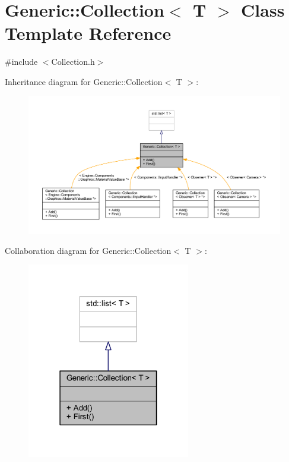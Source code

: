 \hypertarget{classGeneric_1_1Collection}{}\section{Generic\+:\+:Collection$<$ T $>$ Class Template Reference}
\label{classGeneric_1_1Collection}


{\ttfamily \#include $<$Collection.\+h$>$}



Inheritance diagram for Generic\+:\+:Collection$<$ T $>$\+:
\nopagebreak
\begin{figure}[H]
\begin{center}
\leavevmode
\includegraphics[width=350pt]{classGeneric_1_1Collection__inherit__graph}
\end{center}
\end{figure}


Collaboration diagram for Generic\+:\+:Collection$<$ T $>$\+:
\nopagebreak
\begin{figure}[H]
\begin{center}
\leavevmode
\includegraphics[width=202pt]{classGeneric_1_1Collection__coll__graph}
\end{center}
\end{figure}
